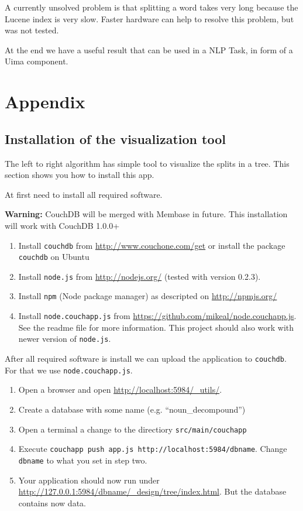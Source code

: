 \documentclass[11pt, accentcolor=tud9b, nochapname]{tudreport}
\begin{document}
A currently unsolved problem is that splitting a word takes very long because the Lucene index is very slow. Faster hardware can help to resolve this problem, but was not tested.

At the end we have a useful result that can be used in a NLP Task, in form of a Uima component.

\appendix

\chapter{Appendix}

\section{Installation of the visualization tool}

The left to right algorithm has simple tool to visualize the splits in a tree. This section shows you how to install this app.

At first need to install all required software.

\textbf{Warning:} CouchDB will be merged with Membase in future. This installation will work with CouchDB 1.0.0+

\begin{enumerate}
  \item Install \texttt{couchdb} from \url{http://www.couchone.com/get} or install the package \texttt{couchdb} on Ubuntu
  \item Install \texttt{node.js} from \url{http://nodejs.org/} (tested with version 0.2.3).
  \item Install \texttt{npm} (Node package manager) as descripted on \url{http://npmjs.org/}
  \item Install \texttt{node.couchapp.js} from \url{https://github.com/mikeal/node.couchapp.js}. See the readme file for more information. This project should also work with newer version of \texttt{node.js}.
\end{enumerate}

After all required software is install we can upload the application to \texttt{couchdb}. For that we use \texttt{node.couchapp.js}.

\begin{enumerate}
  \item Open a browser and open \url{http://localhost:5984/_utils/}.
  \item Create a database with some name (e.g. ``noun\_decompound'')
  \item Open a terminal a change to the directiory \texttt{src/main/couchapp}
  \item Execute \texttt{couchapp push app.js http://localhost:5984/dbname}. Change \texttt{dbname} to what you set in step two.
  \item Your application should now run under \url{http://127.0.0.1:5984/dbname/_design/tree/index.html}. But the database contains now data.
\end{enumerate}
\end{document}
